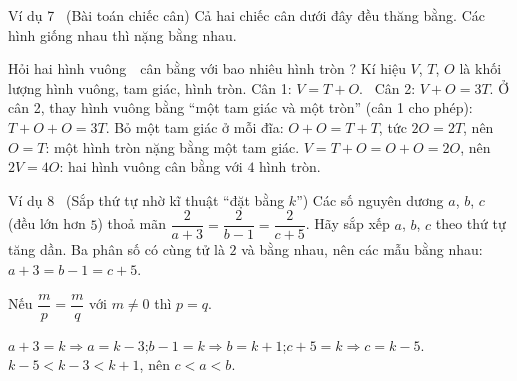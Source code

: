 \begin{exbox}{Ví dụ 7 \ (Bài toán chiếc cân)}
Cả hai chiếc cân dưới đây đều thăng bằng. Các hình giống nhau thì nặng bằng nhau.
\begin{center}
\rvaaScale{\rvaaSq}{\rvaaTri\,\rvaaCir}\hspace{1.2cm}\rvaaScale{\rvaaSq\,\rvaaCir}{\rvaaTri\,\rvaaTri\,\rvaaTri}
\end{center}
Hỏi hai hình vuông \rvaaSq\,\rvaaSq\ cân bằng với bao nhiêu hình tròn \rvaaCir?
\guide
{}
Kí hiệu $V$, $T$, $O$ là khối lượng hình vuông, tam giác, hình tròn. Cân 1: $V=T+O$. \ Cân 2: $V+O=3T$.
Ở cân 2, thay hình vuông bằng ``một tam giác và một tròn'' (cân 1 cho phép):
$T+O+O=3T$.
Bỏ một tam giác ở mỗi đĩa: $O+O=T+T$, tức $2O=2T$, nên $O=T$: một hình tròn nặng bằng một tam giác.
$V=T+O=O+O=2O$, nên $2V=4O$: hai hình vuông cân bằng với $4$ hình tròn.
\end{exbox}

\begin{exbox}{Ví dụ 8 \ (Sắp thứ tự nhờ kĩ thuật ``đặt bằng $k$'')}
Các số nguyên dương $a$, $b$, $c$ (đều lớn hơn $5$) thoả mãn\quad
$\dfrac{2}{a+3}=\dfrac{2}{b-1}=\dfrac{2}{c+5}$. Hãy sắp xếp $a$, $b$, $c$ theo thứ tự tăng dần.
\guide
{}
Ba phân số có cùng tử là $2$ và bằng nhau, nên các mẫu bằng nhau: $a+3=b-1=c+5$.
\begin{recallbox}Nếu $\dfrac{m}{p}=\dfrac{m}{q}$ với $m\neq 0$ thì $p=q$.\end{recallbox}
$a+3=k\Rightarrow a=k-3$;\quad $b-1=k\Rightarrow b=k+1$;\quad $c+5=k\Rightarrow c=k-5$.
$k-5<k-3<k+1$, nên $c<a<b$.
\end{exbox}

\clearpage
{}

